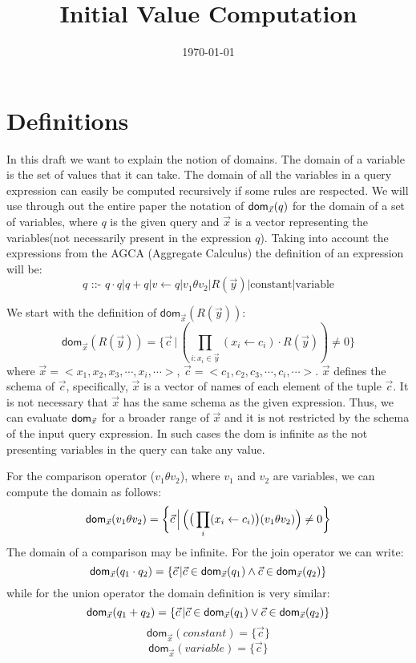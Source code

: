 \documentclass[12pt]{article}
\begin{document}
\title{Initial Value Computation}
\author{}
\date{\today}
\maketitle
\newcommand{\dom}{\textsf{dom}}

\section{Definitions}
In this draft we want to explain the notion of domains. The domain of a variable is the set of values that it can take. The domain of all the variables in a query expression can easily be computed recursively if some rules are respected. We will use through out the entire paper the notation of $\text{\dom{}}_{\vec x}(q)$ for the domain of a set of variables, where $q$ is the given query and $\vec x$ is a vector representing the variables(not necessarily present in the expression $q$). Taking into account the expressions from the AGCA (Aggregate Calculus\cite{1}) the definition of an expression will be: 
$$q\text{ ::- }q\cdot q | q + q|v \gets q |v_{1}\theta v_{2}|R(\vec{y})|\text{constant}|\text{variable}$$

We start with the definition of $\dom{}_{\vec x}(R(\vec y))$:
$$\dom{}_{\vec x}(R(\vec y))=\bigg\{\vec c\,\Big|\,(\prod_{i:x_{i}\in \vec y}^{}(x_{i}\gets c_{i})\cdot R(\vec y))\not= 0\bigg\} $$where $\vec x=<x_1,x_2,x_3,\cdots,x_i,\cdots>$, $\vec c=<c_1,c_2,c_3,\cdots,c_i,\cdots>$.  $\vec{x}$ defines the schema of $\vec{c}$, specifically, $\vec{x}$ is a vector of names of each element of the tuple $\vec{c}$. It is not necessary that $\vec{x}$  has the same schema as the given expression. Thus, we can evaluate $\text{\dom}_{\vec{x}}$ for a broader range of $\vec{x}$ and it is not restricted by the schema of the input query expression. In such cases the \dom{} is infinite as the not presenting variables in the query can take any value.\\
\par
For the comparison operator ($v_{1}\theta v_{2}$), where $v_1$ and $v_2$ are variables, we can compute the domain as follows:
\begin{equation*}
\text{\dom{}}_{\vec{x}}(v_{1}\theta v_{2})=\bigg\{\vec{c}\,\Big|\,\Big(\big(\prod_{i}(x_{i}\gets c_{i})\big)(v_{1}\theta v_{2})\Big)\not= 0\bigg\}
\end{equation*}
The domain of a comparison may be infinite. For the join operator we can write:
\begin{equation*}
\text{\dom{}}_{\vec{x}}(q_{1}\cdot q_{2})=\{\vec{c}\,|\vec{c}\in\text{\dom{}}_{\vec{x}}(q_{1})\land\vec{c}\in\text{\dom{}}_{\vec{x}}(q_{2})\}
\end{equation*}
while for the union operator the domain definition is very similar:
\begin{equation*}
\text{\dom{}}_{\vec{x}}(q_{1}+ q_{2})=\{\vec{c}\,|\vec{c}\in\text{\dom{}}_{\vec{x}}(q_{1})\lor\vec{c}\in\text{\dom{}}_{\vec{x}}(q_{2})\}
\end{equation*}
$$\dom{}_{\vec x}(constant)=\Big\{\vec c\Big\}$$
$$\dom{}_{\vec x}(variable)=\Big\{\vec c\Big\}$$
\end{document}
